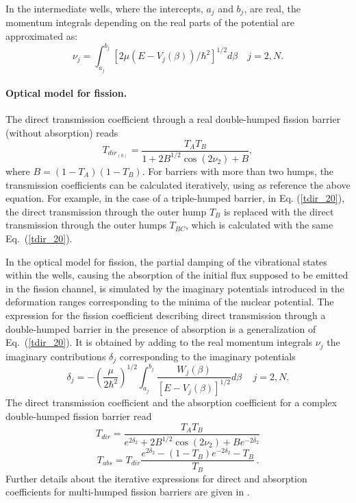 In the intermediate wells, where the intercepts, $a_{j}$ and $b_{j}$, are
real, the momentum integrals depending on the real parts of the potential
are approximated as:
\begin{equation}
\nu_{j}=\int_{a_{j}}^{b_{j}}[2\mu(E-V_{j}(\beta))/\hbar^{2}]^{1/2}d\beta%
\quad j=2,N.
\end{equation}

\medskip

\paragraph*{Optical model for fission.}

The direct transmission coefficient through a real double-humped fission
barrier (without absorption) reads~\cite{Bhandari:79}
\begin{equation}
T_{dir_{(0)}}=\frac{T_{A}T_{B}}{1+2B^{1/2}\cos (2\nu_{2})+B},  \label{tdir_20}
\end{equation}%
where $B=(1-T_{A})(1-T_{B})$. For barriers with more than two humps, the
transmission coefficients can be calculated iteratively, using as reference
the above equation. For example, in the case of a triple-humped barrier, in Eq.%
(\ref{tdir_20}), the direct transmission through the outer hump $T_B$ is
replaced with the direct transmission through the outer humps $T_{BC}$,
which is calculated with the same Eq.~(\ref{tdir_20}).

In the optical model for fission, the partial damping of the vibrational
states within the wells, causing the absorption of the initial flux supposed
to be emitted in the fission channel, is simulated by the imaginary
potentials introduced in the deformation ranges corresponding to the minima
of the nuclear potential. The expression for the fission coefficient
describing direct transmission through a double-humped barrier in the
presence of absorption is a generalization of Eq.~(\ref{tdir_20}). It is
obtained by adding to the real momentum integrals $\nu _{j}$ the imaginary
contributions $\delta _{j}$ corresponding to the imaginary potentials \cite%
{Bhandari:79}
\begin{equation}
\delta _{j}=-\left( \frac{\mu }{2\hbar ^{2}}\right)
^{1/2}\int_{a_{j}}^{b_{j}}\frac{W_{j}(\beta )}{[E-V_{j}(\beta )]^{1/2}}%
d\beta \,\quad j=2,N.
\end{equation}%
The direct transmission coefficient and the absorption coefficient for a
complex double-humped fission barrier read
\begin{equation}
T_{dir}=\frac{T_{A}T_{B}}{e^{2\delta _{2}}+2B^{1/2}\cos (2\nu
_{2})+Be^{-2\delta _{2}}}  \label{tdir_2}
\end{equation}%
\begin{equation}
T_{abs}=T_{dir}\frac{e^{2\delta _{2}}-(1-T_{B})e^{-2\delta _{2}}-T_{B}}{T_{B}%
}\,.  \label{tabs_2}
\end{equation}%
Further details about the iterative expressions for direct and absorption
coefficients for multi-humped fission barriers are given in \cite{Sin:07a}.

